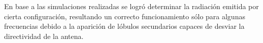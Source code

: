 En base a las simulaciones realizadas se logró determinar la radiación emitida por cierta configuración, resultando un correcto funcionamiento sólo para algunas frecuencias debido a la aparición de lóbulos secundarios capaces de desviar la directividad de la antena.